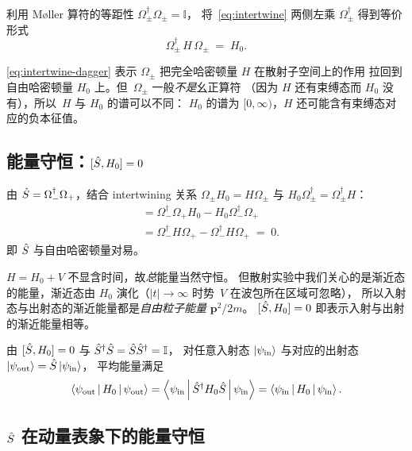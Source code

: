 利用 M\o{}ller 算符的等距性 $\Omega_\pm^\dagger \Omega_\pm = \mathbb{I}$，
将~\eqref{eq:intertwine} 两侧左乘 $\Omega_\pm^\dagger$ 得到等价形式
\begin{equation}
\Omega_\pm^\dagger\, H \,\Omega_\pm \;=\; H_0.
\label{eq:intertwine-dagger}
\end{equation}

\begin{remark}
\eqref{eq:intertwine-dagger} 表示 $\Omega_\pm$ 把完全哈密顿量 $H$ 在散射子空间上的作用
拉回到自由哈密顿量 $H_0$ 上。但~$\Omega_\pm$ 一般\emph{不是}幺正算符
（因为 $H$ 还有束缚态而 $H_0$ 没有），所以~$H$ 与 $H_0$ 的谱可以不同：
$H_0$ 的谱为 $[0,\infty)$，$H$ 还可能含有束缚态对应的负本征值。
\end{remark}

\subsection{能量守恒：$[\hat{S}, H_0] = 0$}

由 $\hat{S} = \Omega_-^\dagger \Omega_+$，结合 intertwining 关系 $\Omega_\pm H_0 = H \Omega_\pm$ 与
$H_0 \Omega_\pm^\dagger = \Omega_\pm^\dagger H$：
\begin{align}
[\Smat, H_0]
&= \Omega_-^\dagger \Omega_+ H_0 - H_0 \Omega_-^\dagger \Omega_+ \nonumber\\
&= \Omega_-^\dagger H \Omega_+ - \Omega_-^\dagger H \Omega_+ \;=\; 0.
\label{eq:S-conserves-H0}
\end{align}
即 $\hat{S}$ 与自由哈密顿量对易。

\begin{remark}
$H = H_0 + V$ 不显含时间，故\emph{总}能量当然守恒。
但散射实验中我们关心的是渐近态的能量，渐近态由 $H_0$ 演化（$|t|\to\infty$ 时势~$V$ 在波包所在区域可忽略），
所以入射态与出射态的渐近能量都是\emph{自由粒子能量} $\bm{p}^2/2m$。
$[\hat{S},H_0]=0$ 即表示入射与出射的渐近能量相等。
\end{remark}

由 $[\hat{S},H_0]=0$ 与 $\hat{S}^\dagger \hat{S} = \hat{S} \hat{S}^\dagger = \mathbb{I}$，
对任意入射态 $\ket{\psi_{\text{in}}}$ 与对应的出射态 $\ket{\psi_{\text{out}}} = \hat{S}\ket{\psi_{\text{in}}}$，
平均能量满足
\begin{equation}
\left\langle \psi_{\text{out}} \,\middle|\, H_0 \,\middle|\, \psi_{\text{out}} \right\rangle
= \left\langle \psi_{\text{in}} \,\middle|\, \hat{S}^\dagger H_0 \hat{S} \,\middle|\, \psi_{\text{in}} \right\rangle
= \left\langle \psi_{\text{in}} \,\middle|\, H_0 \,\middle|\, \psi_{\text{in}} \right\rangle.
\end{equation}

\subsection{$\hat{S}$ 在动量表象下的能量守恒}

